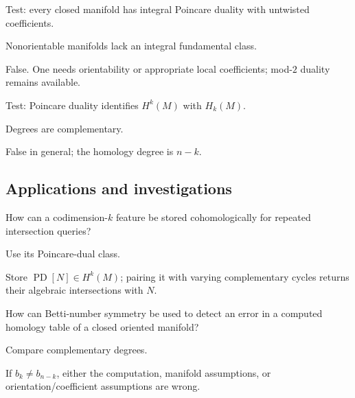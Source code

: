 \begin{exercise}\label{exr:viii33-ped-11}
Test: every closed manifold has integral Poincare duality with untwisted coefficients.
\end{exercise}
\begin{hint}
Nonorientable manifolds lack an integral fundamental class.
\end{hint}
\begin{solution}
False. One needs orientability or appropriate local coefficients; mod-$2$ duality remains available.
\end{solution}

\begin{exercise}\label{exr:viii33-ped-12}
Test: Poincare duality identifies $H^k(M)$ with $H_k(M)$.
\end{exercise}
\begin{hint}
Degrees are complementary.
\end{hint}
\begin{solution}
False in general; the homology degree is $n-k$.
\end{solution}

\subsection*{Applications and investigations}

\begin{exercise}\label{exr:viii33-ped-13}
How can a codimension-$k$ feature be stored cohomologically for repeated intersection queries?
\end{exercise}
\begin{hint}
Use its Poincare-dual class.
\end{hint}
\begin{solution}
Store $\operatorname{PD}[N]\in H^k(M)$; pairing it with varying complementary cycles returns their algebraic intersections with $N$.
\end{solution}

\begin{exercise}\label{exr:viii33-ped-14}
How can Betti-number symmetry be used to detect an error in a computed homology table of a closed oriented manifold?
\end{exercise}
\begin{hint}
Compare complementary degrees.
\end{hint}
\begin{solution}
If $b_k\ne b_{n-k}$, either the computation, manifold assumptions, or orientation/coefficient assumptions are wrong.
\end{solution}

